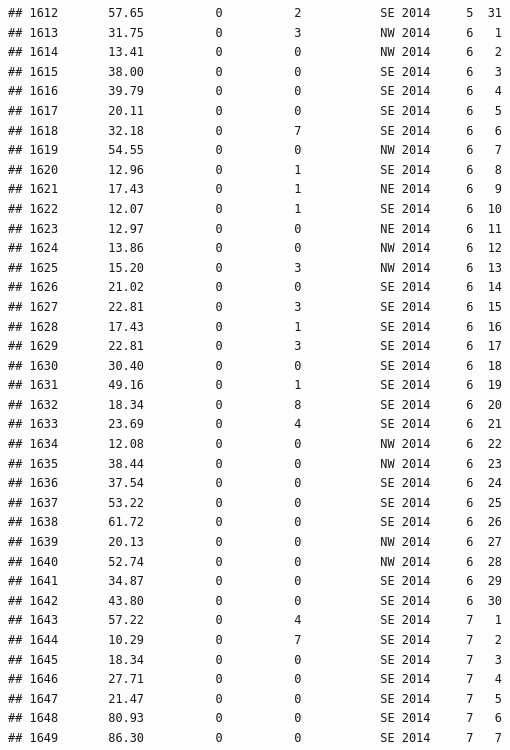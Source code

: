\documentclass[
]{article}
\begin{document}
\begin{verbatim}
## 1612       57.65          0          2           SE 2014     5  31
## 1613       31.75          0          3           NW 2014     6   1
## 1614       13.41          0          0           NW 2014     6   2
## 1615       38.00          0          0           SE 2014     6   3
## 1616       39.79          0          0           SE 2014     6   4
## 1617       20.11          0          0           SE 2014     6   5
## 1618       32.18          0          7           SE 2014     6   6
## 1619       54.55          0          0           NW 2014     6   7
## 1620       12.96          0          1           SE 2014     6   8
## 1621       17.43          0          1           NE 2014     6   9
## 1622       12.07          0          1           SE 2014     6  10
## 1623       12.97          0          0           NE 2014     6  11
## 1624       13.86          0          0           NW 2014     6  12
## 1625       15.20          0          3           NW 2014     6  13
## 1626       21.02          0          0           SE 2014     6  14
## 1627       22.81          0          3           SE 2014     6  15
## 1628       17.43          0          1           SE 2014     6  16
## 1629       22.81          0          3           SE 2014     6  17
## 1630       30.40          0          0           SE 2014     6  18
## 1631       49.16          0          1           SE 2014     6  19
## 1632       18.34          0          8           SE 2014     6  20
## 1633       23.69          0          4           SE 2014     6  21
## 1634       12.08          0          0           NW 2014     6  22
## 1635       38.44          0          0           NW 2014     6  23
## 1636       37.54          0          0           SE 2014     6  24
## 1637       53.22          0          0           SE 2014     6  25
## 1638       61.72          0          0           SE 2014     6  26
## 1639       20.13          0          0           NW 2014     6  27
## 1640       52.74          0          0           NW 2014     6  28
## 1641       34.87          0          0           SE 2014     6  29
## 1642       43.80          0          0           SE 2014     6  30
## 1643       57.22          0          4           SE 2014     7   1
## 1644       10.29          0          7           SE 2014     7   2
## 1645       18.34          0          0           SE 2014     7   3
## 1646       27.71          0          0           SE 2014     7   4
## 1647       21.47          0          0           SE 2014     7   5
## 1648       80.93          0          0           SE 2014     7   6
## 1649       86.30          0          0           SE 2014     7   7

\end{verbatim}
\end{document}

